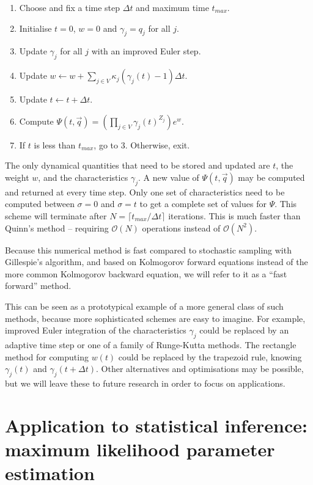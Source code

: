 \documentclass{article}
\begin{document}
\begin{enumerate}
    \item Choose and fix a time step $\Delta t$ and maximum time $t_{max}$.
    \item Initialise $t = 0$, $w = 0$ and $\gamma_j = q_j$ for all $j$.
    \item Update $\gamma_j$ for all $j$ with an improved Euler step.
    \item Update $w \leftarrow w + \sum_{j \in V} \kappa_j (\gamma_j(t)-1)
    \Delta t$.
    \item Update $t \leftarrow t + \Delta t$.
    \item Compute $\Psi(t, \vec{q}) = \left(\prod_{j \in V}
    \gamma_j(t)^{Z_j}\right) e^w$.
    \item If $t$ is less than $t_{max}$, go to 3. Otherwise, exit.
\end{enumerate}

The only dynamical quantities that need to be stored and updated are $t$, the
weight $w$, and the
characteristics $\gamma_j$. A new value of $\Psi(t, \vec{q})$ may be computed
and returned at every time step. Only one set of characteristics need to be computed
between $\sigma = 0$ and $\sigma = t$ to get a complete set of values for
$\Psi$. This scheme will terminate after $N = \lceil t_{max} / \Delta t \rceil$
iterations. This is much faster than Quinn's method -- requiring
$\mathcal{O}(N)$ operations instead of $\mathcal{O}(N^2)$.

Because this numerical method is fast compared to stochastic sampling with
Gillespie's algorithm, and based on Kolmogorov forward equations instead of the
more common Kolmogorov backward equation, we will refer to it as a ``fast
forward'' method.

This can be seen as a prototypical example of a more general class of such
methods, because more sophisticated schemes are easy to imagine. For example, improved Euler integration
of the characteristics $\gamma_j$ could be replaced by an adaptive time step or
one of a family of Runge-Kutta methods. The rectangle method for computing $w(t)$
could be replaced by the trapezoid rule, knowing $\gamma_j(t)$ and $\gamma_j(t +
\Delta t)$. Other alternatives and optimisations may be possible, but we will
leave these to future research in order to focus on applications.

\section{Application to statistical inference: maximum likelihood parameter estimation}
\end{document}
